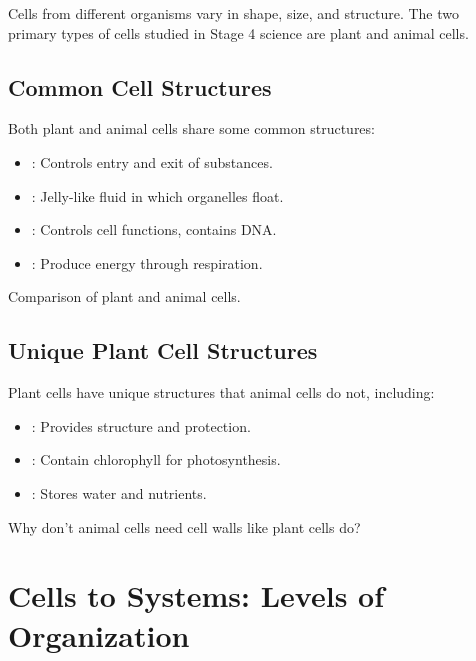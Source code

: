 Cells from different organisms vary in shape, size, and structure. The two primary types of cells studied in Stage 4 science are plant and animal cells.

\subsection{Common Cell Structures}

Both plant and animal cells share some common structures:

\begin{itemize}
    \item {}: Controls entry and exit of substances.
    \item {}: Jelly-like fluid in which organelles float.
    \item {}: Controls cell functions, contains DNA.
    \item {}: Produce energy through respiration.
\end{itemize}

\begin{marginfigure}
\caption{Comparison of plant and animal cells.}
\end{marginfigure}

\subsection{Unique Plant Cell Structures}

Plant cells have unique structures that animal cells do not, including:

\begin{itemize}
    \item {}: Provides structure and protection.
    \item {}: Contain chlorophyll for photosynthesis.
    \item {}: Stores water and nutrients.
\end{itemize}

\begin{stopandthink}
Why don't animal cells need cell walls like plant cells do?
\end{stopandthink}

\section{Cells to Systems: Levels of Organization}

